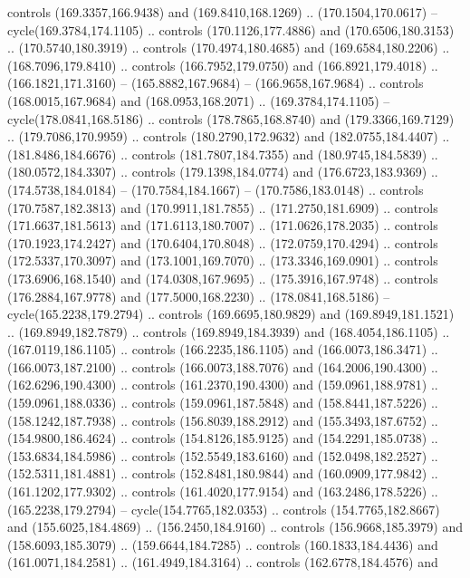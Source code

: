 \begin{scope}[cm={{1.25,0.0,0.0,-1.25,(0.0,442.91375)}}]
    controls (169.3357,166.9438) and (169.8410,168.1269) .. (170.1504,170.0617) --
    cycle(169.3784,174.1105) .. controls (170.1126,177.4886) and
    (170.6506,180.3153) .. (170.5740,180.3919) .. controls (170.4974,180.4685) and
    (169.6584,180.2206) .. (168.7096,179.8410) .. controls (166.7952,179.0750) and
    (166.8921,179.4018) .. (166.1821,171.3160) -- (165.8882,167.9684) --
    (166.9658,167.9684) .. controls (168.0015,167.9684) and (168.0953,168.2071) ..
    (169.3784,174.1105) -- cycle(178.0841,168.5186) .. controls
    (178.7865,168.8740) and (179.3366,169.7129) .. (179.7086,170.9959) .. controls
    (180.2790,172.9632) and (182.0755,184.4407) .. (181.8486,184.6676) .. controls
    (181.7807,184.7355) and (180.9745,184.5839) .. (180.0572,184.3307) .. controls
    (179.1398,184.0774) and (176.6723,183.9369) .. (174.5738,184.0184) --
    (170.7584,184.1667) -- (170.7586,183.0148) .. controls (170.7587,182.3813) and
    (170.9911,181.7855) .. (171.2750,181.6909) .. controls (171.6637,181.5613) and
    (171.6113,180.7007) .. (171.0626,178.2035) .. controls (170.1923,174.2427) and
    (170.6404,170.8048) .. (172.0759,170.4294) .. controls (172.5337,170.3097) and
    (173.1001,169.7070) .. (173.3346,169.0901) .. controls (173.6906,168.1540) and
    (174.0308,167.9695) .. (175.3916,167.9748) .. controls (176.2884,167.9778) and
    (177.5000,168.2230) .. (178.0841,168.5186) -- cycle(165.2238,179.2794) ..
    controls (169.6695,180.9829) and (169.8949,181.1521) .. (169.8949,182.7879) ..
    controls (169.8949,184.3939) and (168.4054,186.1105) .. (167.0119,186.1105) ..
    controls (166.2235,186.1105) and (166.0073,186.3471) .. (166.0073,187.2100) ..
    controls (166.0073,188.7076) and (164.2006,190.4300) .. (162.6296,190.4300) ..
    controls (161.2370,190.4300) and (159.0961,188.9781) .. (159.0961,188.0336) ..
    controls (159.0961,187.5848) and (158.8441,187.5226) .. (158.1242,187.7938) ..
    controls (156.8039,188.2912) and (155.3493,187.6752) .. (154.9800,186.4624) ..
    controls (154.8126,185.9125) and (154.2291,185.0738) .. (153.6834,184.5986) ..
    controls (152.5549,183.6160) and (152.0498,182.2527) .. (152.5311,181.4881) ..
    controls (152.8481,180.9844) and (160.0909,177.9842) .. (161.1202,177.9302) ..
    controls (161.4020,177.9154) and (163.2486,178.5226) .. (165.2238,179.2794) --
    cycle(154.7765,182.0353) .. controls (154.7765,182.8667) and
    (155.6025,184.4869) .. (156.2450,184.9160) .. controls (156.9668,185.3979) and
    (158.6093,185.3079) .. (159.6644,184.7285) .. controls (160.1833,184.4436) and
    (161.0071,184.2581) .. (161.4949,184.3164) .. controls (162.6778,184.4576) and

\end{scope}
